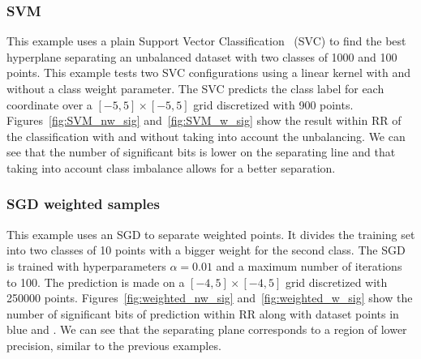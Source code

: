 \subsubsection{SVM}
This example uses a plain Support Vector
Classification~\cite{Platt99probabilisticoutputs} (SVC) to find the best
hyperplane separating an unbalanced dataset with two classes of 1000 and 100
points. This example tests two SVC configurations using a linear kernel with and
without a class weight parameter. The SVC predicts the class label for each
coordinate over a $[-5,5] \times [-5,5]$ grid discretized with 900 points.
Figures~\ref{fig:SVM_nw_sig} and~\ref{fig:SVM_w_sig} show the result within RR
of the classification with and without taking into account the unbalancing. We
can see that the number of significant bits is lower on the separating line and
that taking into account class imbalance allows for a better separation.

\subsubsection{SGD weighted samples}
This example uses an SGD to separate weighted points. It divides the training
set into two classes of 10 points with a bigger weight for the second class. The
SGD is trained with hyperparameters $\alpha=0.01$ and a maximum number of
iterations to 100. The prediction is made on a $[-4,5]\times[-4,5]$ grid
discretized with 250\add{,}000 points. Figures~\ref{fig:weighted_nw_sig}
and~\ref{fig:weighted_w_sig} show the number of significant bits of prediction
within RR along with dataset points in blue and  . We can see that the
separating plane corresponds to a region of lower precision, similar to the
previous examples.


